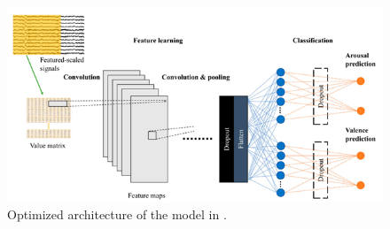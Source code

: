 \begin{figure}[h!]
\includegraphics[width=12cm]{img/related_work/keelawal_architecture.png}
\centering
\caption{Optimized architecture of the model in  \cite{keelawat_comparative_2021}.}\label{fig_keelawal_architecture}
\end{figure}

